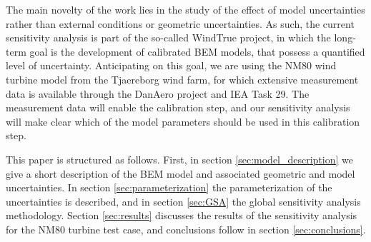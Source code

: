 The main novelty of the work lies in the study of the effect of model uncertainties rather than external conditions or geometric uncertainties. As such, the current sensitivity analysis is part of the so-called WindTrue project, in which the long-term goal is the development of calibrated BEM models, that possess a quantified level of uncertainty. Anticipating on this goal, we are using the NM80 wind turbine model from the Tjaereborg wind farm, for which extensive measurement data is available through the DanAero project \cite{Troldborg2013} and IEA Task 29. The measurement data will enable the calibration step, and our sensitivity analysis will make clear which of the model parameters should be used in this calibration step.

This paper is structured as follows. First, in section \ref{sec:model_description} we give a short description of the BEM model and associated geometric and model uncertainties. In section \ref{sec:parameterization} the parameterization of the uncertainties is described, and in section \ref{sec:GSA} the global sensitivity analysis methodology. Section \ref{sec:results} discusses the results of the sensitivity analysis for the NM80 turbine test case, and conclusions follow in section \ref{sec:conclusions}.

